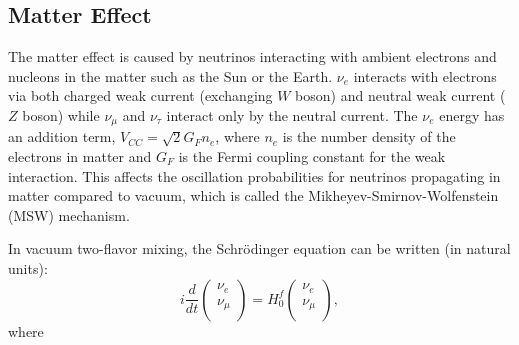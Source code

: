 %


\subsection{Matter Effect}

The matter effect is caused by neutrinos interacting with ambient electrons and nucleons in the matter such as the Sun or the Earth. $\nu_e$ interacts with electrons via both charged weak current (exchanging $W$ boson) and neutral weak current ($Z$ boson) while $\nu_\mu$ and $\nu_\tau$ interact only by the neutral current. The $\nu_e$ energy has an addition term, $V_{CC} =\sqrt2G_Fn_e$, where $n_e$ is the number density of the electrons in matter and $G_F$ is the Fermi coupling constant for the weak interaction. This affects the oscillation probabilities for neutrinos propagating in matter compared to vacuum, which is called the Mikheyev-Smirnov-Wolfenstein (MSW) mechanism\cite{smirnov2016solar,smirnov2005msw}.

In vacuum two-flavor mixing, the Schr\"{o}dinger equation can be written (in natural units)\cite{xing2011neutrinos}:
\begin{equation}\label{eq:2flavor_simple}
	i\frac{d}{dt}\begin{pmatrix}
		\nu_e\\
		\nu_\mu\\
	\end{pmatrix}
	=
	H^f_0
	\begin{pmatrix}
		\nu_e\\
		\nu_\mu\\
	\end{pmatrix},
\end{equation}
where 

